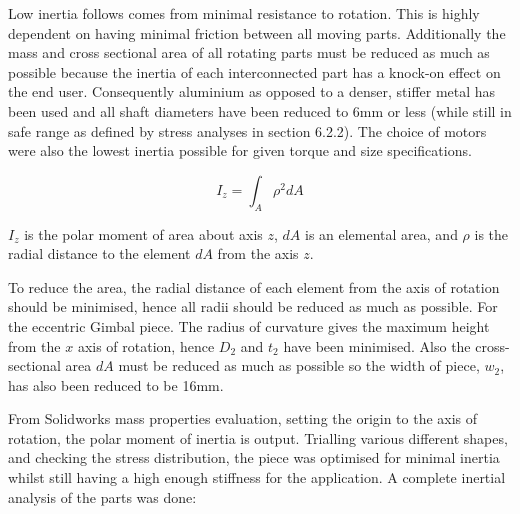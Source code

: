 Low inertia follows comes from minimal resistance to rotation. This is highly dependent on having minimal friction between all moving parts. Additionally the mass and cross sectional area of all rotating parts must be reduced as much as possible because the inertia of each interconnected part has a knock-on effect on the end user. Consequently aluminium as opposed to a denser, stiffer metal has been used and all shaft diameters have been reduced to 6mm or less (while still in safe range as defined by stress analyses in section 6.2.2). The choice of motors were also the lowest inertia possible for given torque and size specifications.

\begin{equation}
  I_z = \int_A \rho^2 dA
\end{equation}

$I_z$ is the polar moment of area about axis $z$, $dA$ is an elemental area, and $\rho$ is the radial distance to the element $dA$ from the axis $z$.

To reduce the area, the radial distance of each element from the axis of rotation should be minimised, hence all radii should be reduced as much as possible. For the eccentric Gimbal piece. The radius of curvature gives the maximum height from the $x$ axis of rotation, hence $D_2$ and $t_2$ have been minimised. Also the cross-sectional area $dA$ must be reduced as much as possible so the width of piece, $w_2$, has also been reduced to be 16mm.

From Solidworks mass properties evaluation, setting the origin to the axis of rotation, the polar moment of inertia is output. Trialling various different shapes, and checking the stress distribution, the piece was optimised for minimal inertia whilst still having a high enough stiffness for the application.
A complete inertial analysis of the parts was done:


